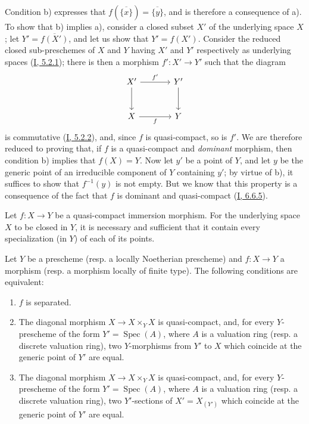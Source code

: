 Condition b) expresses that $f(\overline{\{x\}})=\overline{\{y\}}$, and is
therefore a consequence of a). To show that b) implies a), consider a closed
subset $X'$ of the underlying space $X$; let $Y'=\overline{f(X')}$, and
let us show that $Y'=f(X')$. Consider the reduced closed sub-preschemes of
$X$ and $Y$ having $X'$ and $Y'$ respectively as underlying spaces
(\hyperref[I.5.2.1]{I, 5.2.1}); there is then a morphism $f':X'\to Y'$ such
that the diagram
\[
\begin{tikzcd}[column sep=large,row sep=large]
X' \arrow[r,"f'"] \arrow[d] & Y' \arrow[d] \\
X \arrow[r,"f"'] & Y
\end{tikzcd}
\]
is commutative (\hyperref[I.5.2.2]{I, 5.2.2}), and, since $f$ is
quasi-compact, so is $f'$. We are therefore reduced to proving that, if
$f$ is a quasi-compact and \emph{dominant} morphism, then
condition b) implies that $f(X)=Y$. Now let $y'$ be a point of $Y$, and let $y$
be the generic point of an irreducible component of $Y$ containing $y'$; by
virtue of b), it suffices to show that $f^{-1}(y)$ is not empty. But we know
that this property is a consequence of the fact that $f$ is dominant and
quasi-compact (\hyperref[I.6.6.5]{I, 6.6.5}).

\begin{corollary}[7.2.2]
\label{II.7.2.2}
Let $f:X\to Y$ be a quasi-compact immersion morphism. For the underlying
space $X$ to be closed in $Y$, it is necessary and sufficient that it contain
every specialization (in $Y$) of each of its points.
\end{corollary}

\begin{proposition}[7.2.3]
\label{II.7.2.3}
Let $Y$ be a prescheme (resp. a locally Noetherian prescheme) and $f:X\to Y$
a morphism (resp. a morphism locally of finite type). The following
conditions are equivalent:
\begin{enumerate}
\item[\rm a)] $f$ is separated.
\item[\rm b)] The diagonal morphism $X\to X\times_YX$ is quasi-compact, and,
for every $Y$-prescheme of the form $Y'=\operatorname{Spec}(A)$, where $A$ is a
valuation ring (resp. a discrete valuation ring), two
$Y$-morphisms from $Y'$ to $X$ which coincide at the generic point of $Y'$ are
equal.
\item[\rm c)] The diagonal morphism $X\to X\times_YX$ is quasi-compact, and,
for every $Y$-prescheme of the form $Y'=\operatorname{Spec}(A)$, where $A$ is a
valuation ring (resp. a discrete valuation ring), two
$Y'$-sections of $X'=X_{(Y')}$ which coincide at the generic point of $Y'$ are
equal.
\end{enumerate}
\end{proposition}

